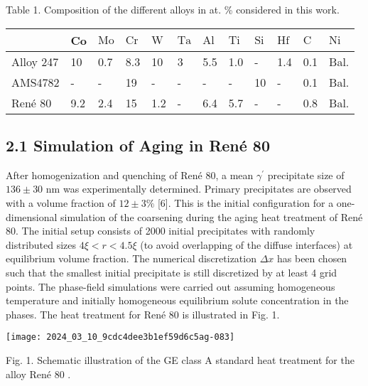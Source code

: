 \documentclass[10pt]{article}
\begin{document}
Table 1. Composition of the different alloys in at. \% considered in this work.

\begin{center}
\begin{tabular}{l|l|l|l|l|l|l|l|l|l|l|l}
\hline
 & Co & $\mathrm{Mo}$ & $\mathrm{Cr}$ & $\mathrm{W}$ & $\mathrm{Ta}$ & $\mathrm{Al}$ & $\mathrm{Ti}$ & $\mathrm{Si}$ & $\mathrm{Hf}$ & $\mathrm{C}$ & $\mathrm{Ni}$ \\
\hline
Alloy 247 & 10 & 0.7 & 8.3 & 10 & 3 & 5.5 & 1.0 & - & 1.4 & 0.1 & Bal. \\
\hline
AMS4782 & - & - & 19 & - & - & - & - & 10 & - & 0.1 & Bal. \\
\hline
René 80 & 9.2 & 2.4 & 15 & 1.2 & - & 6.4 & 5.7 & - & - & 0.8 & Bal. \\
\hline
\end{tabular}
\end{center}

\subsection*{2.1 Simulation of Aging in René 80}
After homogenization and quenching of René 80, a mean $\gamma^{\prime}$ precipitate size of $136 \pm 30$ $\mathrm{nm}$ was experimentally determined. Primary precipitates are observed with a volume fraction of $12 \pm 3 \%$ [6]. This is the initial configuration for a one-dimensional simulation of the coarsening during the aging heat treatment of René 80. The initial setup consists of 2000 initial precipitates with randomly distributed sizes $4 \xi<r<4.5 \xi$ (to avoid overlapping of the diffuse interfaces) at equilibrium volume fraction. The numerical discretization $\Delta x$ has been chosen such that the smallest initial precipitate is still discretized by at least 4 grid points. The phase-field simulations were carried out assuming homogeneous temperature and initially homogeneous equilibrium solute concentration in the phases. The heat treatment for René 80 is illustrated in Fig. 1.

\begin{center}
\texttt{[image: 2024\_03\_10\_9cdc4dee3b1ef59d6c5ag-083]}
\end{center}

Fig. 1. Schematic illustration of the GE class A standard heat treatment for the alloy René 80 .
\end{document}
